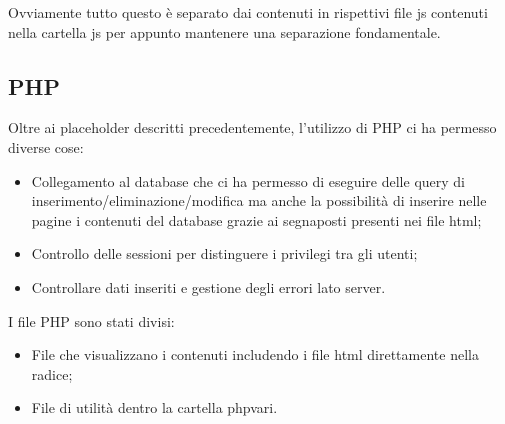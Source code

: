 Ovviamente tutto questo è separato dai contenuti in rispettivi file js contenuti nella cartella js per appunto mantenere una separazione fondamentale.

\subsection{PHP}

Oltre ai placeholder descritti precedentemente, l'utilizzo di PHP ci ha permesso diverse cose:
\begin{itemize}
    \item Collegamento al database che ci ha permesso di eseguire delle query di inserimento/eliminazione/modifica ma anche la possibilità
        di inserire nelle pagine i contenuti del database grazie ai segnaposti presenti nei file html;
    \item Controllo delle sessioni per distinguere i privilegi tra gli utenti;
    \item Controllare dati inseriti e gestione degli errori lato server.
\end{itemize}

I file PHP sono stati divisi:
\begin{itemize}
    \item File che visualizzano i contenuti includendo i file html direttamente nella radice;
    \item File di utilità dentro la cartella php\textunderscore vari.
\end{itemize}